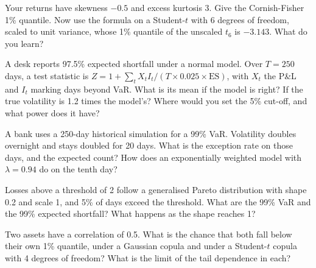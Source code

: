 \begin{question}\label{iq:iv2:risk-validation-and-regulation:27}
Your returns have skewness $-0.5$ and excess kurtosis 3. Give the Cornish-Fisher 1\% quantile. Now use the formula on a Student-$t$ with 6 degrees of freedom, scaled to unit variance, whose 1\% quantile of the unscaled $t_6$ is $-3.143$. What do you learn?
\end{question}

\begin{question}\label{iq:iv2:risk-validation-and-regulation:28}
A desk reports 97.5\% expected shortfall under a normal model. Over $T = 250$ days, a test statistic is $Z = 1 + \sum_t X_t I_t/(T \times 0.025 \times \mathrm{ES})$, with $X_t$ the P\&L and $I_t$ marking days beyond VaR. What is its mean if the model is right? If the true volatility is 1.2 times the model's? Where would you set the 5\% cut-off, and what power does it have?
\end{question}

\begin{question}\label{iq:iv2:risk-validation-and-regulation:29}
A bank uses a 250-day historical simulation for a 99\% VaR. Volatility doubles overnight and stays doubled for 20 days. What is the exception rate on those days, and the expected count? How does an exponentially weighted model with $\lambda = 0.94$ do on the tenth day?
\end{question}

\begin{question}\label{iq:iv2:risk-validation-and-regulation:30}
Losses above a threshold of 2 follow a generalised Pareto distribution with shape 0.2 and scale 1, and 5\% of days exceed the threshold. What are the 99\% VaR and the 99\% expected shortfall? What happens as the shape reaches 1?
\end{question}

\begin{question}\label{iq:iv2:risk-validation-and-regulation:31}
Two assets have a correlation of 0.5. What is the chance that both fall below their own 1\% quantile, under a Gaussian copula and under a Student-$t$ copula with 4 degrees of freedom? What is the limit of the tail dependence in each?
\end{question}

